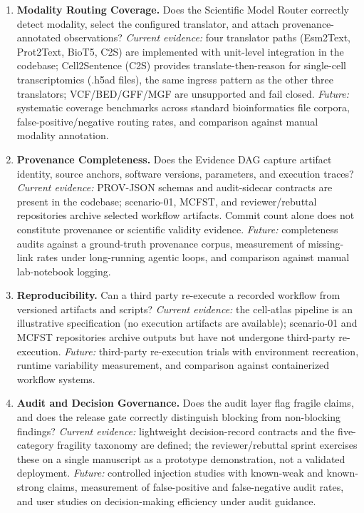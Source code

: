 \documentclass[sn-basic,Numbered,pdflatex]{sn-jnl}
\begin{document}
\begin{enumerate}
    \item \textbf{Modality Routing Coverage.} Does the Scientific Model Router correctly detect modality, select the configured translator, and attach provenance-annotated observations? \textit{Current evidence:} four translator paths (Esm2Text, Prot2Text, BioT5, C2S) are implemented with unit-level integration in the codebase; Cell2Sentence (C2S) provides translate-then-reason for single-cell transcriptomics (.h5ad files), the same ingress pattern as the other three translators; VCF/BED/GFF/MGF are unsupported and fail closed. \textit{Future:} systematic coverage benchmarks across standard bioinformatics file corpora, false-positive/negative routing rates, and comparison against manual modality annotation.
    \item \textbf{Provenance Completeness.} Does the Evidence DAG capture artifact identity, source anchors, software versions, parameters, and execution traces? \textit{Current evidence:} PROV-JSON schemas and audit-sidecar contracts are present in the codebase; scenario-01, MCFST, and reviewer/rebuttal repositories archive selected workflow artifacts. Commit count alone does not constitute provenance or scientific validity evidence. \textit{Future:} completeness audits against a ground-truth provenance corpus, measurement of missing-link rates under long-running agentic loops, and comparison against manual lab-notebook logging.
    \item \textbf{Reproducibility.} Can a third party re-execute a recorded workflow from versioned artifacts and scripts? \textit{Current evidence:} the cell-atlas pipeline is an illustrative specification (no execution artifacts are available); scenario-01 and MCFST repositories archive outputs but have not undergone third-party re-execution. \textit{Future:} third-party re-execution trials with environment recreation, runtime variability measurement, and comparison against containerized workflow systems.
    \item \textbf{Audit and Decision Governance.} Does the audit layer flag fragile claims, and does the release gate correctly distinguish blocking from non-blocking findings? \textit{Current evidence:} lightweight decision-record contracts and the five-category fragility taxonomy are defined; the reviewer/rebuttal sprint exercises these on a single manuscript as a prototype demonstration, not a validated deployment. \textit{Future:} controlled injection studies with known-weak and known-strong claims, measurement of false-positive and false-negative audit rates, and user studies on decision-making efficiency under audit guidance.
\end{enumerate}
\end{document}
